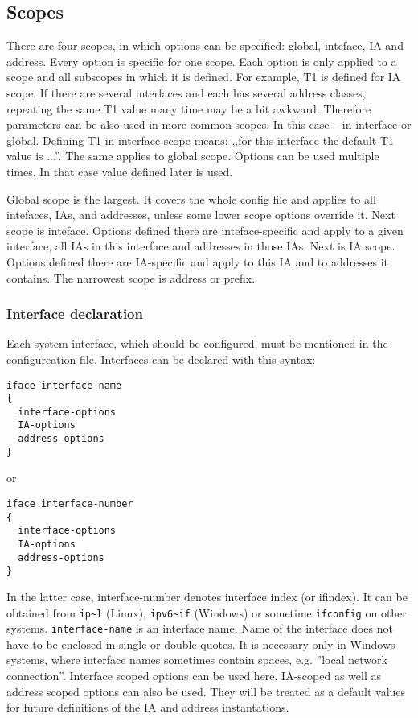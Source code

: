 \subsection{Scopes}
\label{scope}
There are four scopes, in which options can be specified: global,
inteface, IA and address. Every option is specific for one scope.
Each option is only applied to a scope and all subscopes in which it is
defined. For example, T1 is defined for
IA scope. If there are several interfaces and each has several address
classes, repeating the same T1 value many time may be a bit awkward.
Therefore parameters can be also used in more common scopes. In this
case -- in interface or global. Defining T1 in interface scope means:
,,for this interface the default T1 value is ...''. The same applies
to global scope. Options can be used multiple times. In that case
value defined later is used.

Global scope is the largest. It covers the whole config file and
applies to all intefaces, IAs, and addresses, unless some lower scope
options override it. Next scope is inteface. Options defined there
are inteface-specific and apply to a given interface, all IAs in this
interface and addresses in those IAs. Next is IA scope. Options
defined there are IA-specific and apply to this IA and to addresses it
contains. The narrowest scope is address or prefix.

\subsubsection{Interface declaration}
\label{client-scope-iface}
Each system interface, which should be configured, must be mentioned in
the configureation file. Interfaces can be declared with this syntax:
\begin{lstlisting}
iface interface-name
{
  interface-options
  IA-options
  address-options
}
\end{lstlisting}

or

\begin{lstlisting}
iface interface-number
{
  interface-options
  IA-options
  address-options
}
\end{lstlisting}

In the latter case, interface-number denotes interface index (or
ifindex). It can be obtained from \verb+ip~l+ (Linux), \verb+ipv6~if+
(Windows) or sometime \verb+ifconfig+ on other systems.
\verb+interface-name+ is an interface name.  Name of the
interface does not have to be enclosed in single or double quotes. It
is necessary only in Windows systems, where interface names sometimes
contain spaces, e.g. ''local network connection''.  Interface scoped
options can be used here. IA-scoped as well as address scoped options
can also be used. They will be treated as a default values for future
definitions of the IA and address instantations.

